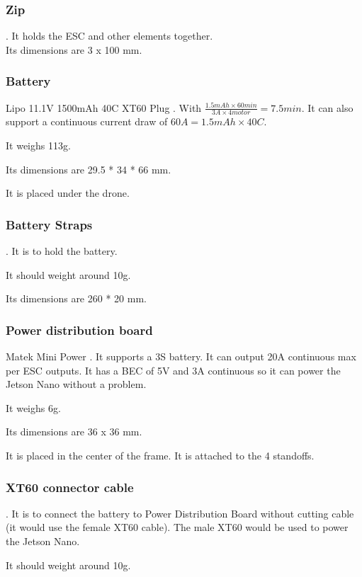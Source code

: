 \subsubsection{Zip}
\cite{bangood_zip_ties}. It holds the ESC and other elements together.\\
Its dimensions are 3 x 100 mm.

\subsubsection{Battery}
Lipo 11.1V 1500mAh 40C XT60 Plug \cite{bangood_battery}. With $ \frac{1.5mAh \times 60min}{3A \times 4motor}= 7.5min$. It can also support a continuous current draw of $60A = 1.5mAh\times 40C$.

It weighs 113g.

Its dimensions are 29.5 * 34 * 66 mm.

It is placed under the drone.

\subsubsection{Battery Straps}
\cite{bangood_battery_strap}. It is to hold the battery.

It should weight around 10g.

Its dimensions are 260 * 20 mm.

\subsubsection{Power distribution board}
Matek Mini Power \cite{bangood_pdb}. It supports a 3S battery. It can output 20A continuous max per ESC outputs. It has a BEC of 5V and 3A continuous so it can power the Jetson Nano without a problem.

It weighs 6g.

Its dimensions are 36 x 36 mm.

It is placed in the center of the frame. It is attached to the 4 standoffs.

\subsubsection{XT60 connector cable}
\cite{bangood_xt60_cable}. It is to connect the battery to Power Distribution Board without cutting cable (it would use the female XT60 cable). The male XT60 would be used to power the Jetson Nano.

It should weight around 10g.

